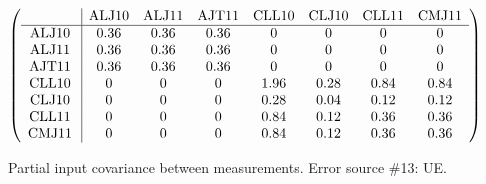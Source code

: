\begin{table}[H]
\scriptsize
\begin{center}
\renewcommand{\arraystretch}{1.1}
\begin{math}\left(\begin{array}{c|ccccccc}
 & \mathrm{ALJ10} & 
\mathrm{ALJ11} & 
\mathrm{AJT11} & 
\mathrm{CLL10} & 
\mathrm{CLJ10} & 
\mathrm{CLL11} & 
\mathrm{CMJ11} \\
\hline
\mathrm{ALJ10} \hspace*{2pt} &       0.36 &       0.36 &       0.36 &  0 &  0 &  0 &  0 \\
\mathrm{ALJ11} \hspace*{2pt} &       0.36 &       0.36 &       0.36 &  0 &  0 &  0 &  0 \\
\mathrm{AJT11} \hspace*{2pt} &       0.36 &       0.36 &       0.36 &  0 &  0 &  0 &  0 \\
\mathrm{CLL10} \hspace*{2pt} &  0 &  0 &  0 &       1.96 &       0.28 &       0.84 &       0.84 \\
\mathrm{CLJ10} \hspace*{2pt} &  0 &  0 &  0 &       0.28 &       0.04 &       0.12 &       0.12 \\
\mathrm{CLL11} \hspace*{2pt} &  0 &  0 &  0 &       0.84 &       0.12 &       0.36 &       0.36 \\
\mathrm{CMJ11} \hspace*{2pt} &  0 &  0 &  0 &       0.84 &       0.12 &       0.36 &       0.36 \\
\end{array}\right)\end{math}
\caption{Partial input covariance between measurements. Error source \#13: UE.}
\renewcommand{\arraystretch}{1}
\end{center}
\end{table}
